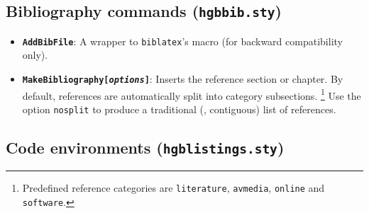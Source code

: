 \documentclass[english]{hgbarticle}
\begin{document}
\subsection{Bibliography commands (\texttt{hgbbib.sty})}



\begin{itemize}
\item \textbf{\texttt{{\bs}AddBibFile}}: A wrapper to \texttt{biblatex}'s \verb!! macro
(for backward compatibility only).
\item \textbf{\texttt{{\bs}MakeBibliography[\emph{options}]}}: Inserts the reference section or chapter.
By default, references are automatically split into category subsections.%
\footnote{Predefined reference categories are \texttt{literature}, \texttt{avmedia}, \texttt{online} and \texttt{software}.}
Use the option \texttt{nosplit} to produce a traditional (\ie, contiguous) list of references.
\end{itemize}



\subsection{Code environments (\texttt{hgblistings.sty})}
\end{document}
